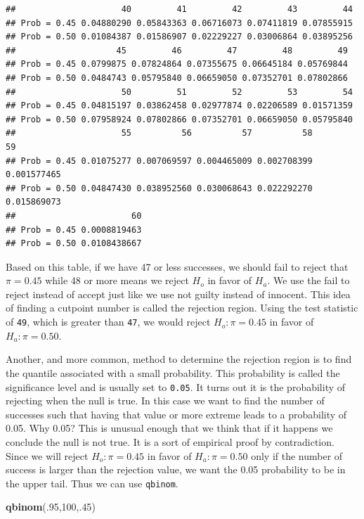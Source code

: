 \documentclass[]{book}
\newenvironment{Shaded}{\begin{snugshade}}{\end{snugshade}}
\newcommand{\KeywordTok}[1]{\textcolor[rgb]{0.13,0.29,0.53}{\textbf{#1}}}
\newcommand{\DecValTok}[1]{\textcolor[rgb]{0.00,0.00,0.81}{#1}}
\newcommand{\NormalTok}[1]{#1}
\theoremstyle{definition}
\theoremstyle{definition}
\theoremstyle{definition}
\theoremstyle{remark}
\begin{document}
\begin{verbatim}
##                     40         41         42         43         44
## Prob = 0.45 0.04880290 0.05843363 0.06716073 0.07411819 0.07855915
## Prob = 0.50 0.01084387 0.01586907 0.02229227 0.03006864 0.03895256
##                    45         46         47         48         49
## Prob = 0.45 0.0799875 0.07824864 0.07355675 0.06645184 0.05769844
## Prob = 0.50 0.0484743 0.05795840 0.06659050 0.07352701 0.07802866
##                     50         51         52         53         54
## Prob = 0.45 0.04815197 0.03862458 0.02977874 0.02206589 0.01571359
## Prob = 0.50 0.07958924 0.07802866 0.07352701 0.06659050 0.05795840
##                     55          56          57          58          59
## Prob = 0.45 0.01075277 0.007069597 0.004465009 0.002708399 0.001577465
## Prob = 0.50 0.04847430 0.038952560 0.030068643 0.022292270 0.015869073
##                       60
## Prob = 0.45 0.0008819463
## Prob = 0.50 0.0108438667
\end{verbatim}

Based on this table, if we have 47 or less successes, we should fail to
reject that \(\pi = 0.45\) while 48 or more means we reject \(H_{o}\) in
favor of \(H_{a}\). We use the fail to reject instead of accept just
like we use not guilty instead of innocent. This idea of finding a
cutpoint number is called the rejection region. Using the test statistic
of \texttt{49}, which is greater than \texttt{47}, we would reject
\(H_{o}: \pi = 0.45\) in favor of \(H_{a}: \pi = 0.50\).

Another, and more common, method to determine the rejection region is to
find the quantile associated with a small probability. This probability
is called the significance level and is usually set to \texttt{0.05}. It
turns out it is the probability of rejecting when the null is true. In
this case we want to find the number of successes such that having that
value or more extreme leads to a probability of 0.05. Why 0.05? This is
unusual enough that we think that if it happens we conclude the null is
not true. It is a sort of empirical proof by contradiction. Since we
will reject \(H_{o}: \pi = 0.45\) in favor of \(H_{a}: \pi = 0.50\) only
if the number of success is larger than the rejection value, we want the
0.05 probability to be in the upper tail. Thus we can use
\texttt{qbinom}.

\begin{Shaded}
\begin{Highlighting}[]
\KeywordTok{qbinom}\NormalTok{(.}\DecValTok{95}\NormalTok{,}\DecValTok{100}\NormalTok{,.}\DecValTok{45}\NormalTok{)}
\end{Highlighting}
\end{Shaded}
\end{document}
